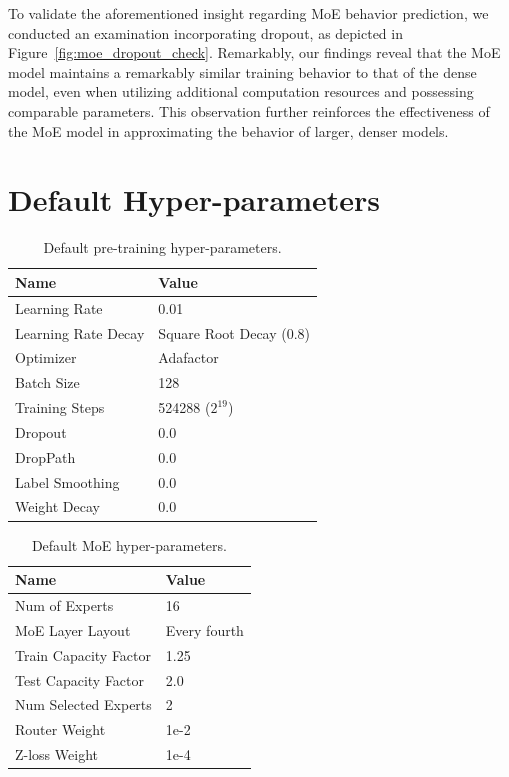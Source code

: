 \documentclass{article}
\begin{document}
To validate the aforementioned insight regarding MoE behavior prediction, we conducted an examination incorporating dropout, as depicted in Figure~\ref{fig:moe_dropout_check}. Remarkably, our findings reveal that the MoE model maintains a remarkably similar training behavior to that of the dense model, even when utilizing additional computation resources and possessing comparable parameters. This observation further reinforces the effectiveness of the MoE model in approximating the behavior of larger, denser models.

\newpage

\section{Default Hyper-parameters}\label{sec:default-hyper-parameters}

\begin{table}[h]
\caption{Default pre-training hyper-parameters.}
\vspace{5pt}
\centering
\begin{tabular}{l l}
\toprule 
Name  &  Value    \\ \midrule
Learning Rate    & 0.01 \\
Learning Rate Decay & Square Root Decay (0.8) \\
Optimizer & Adafactor \\
Batch Size & 128 \\
Training Steps & 524288 ($2^{19}$) \\
Dropout & 0.0 \\
DropPath & 0.0 \\
Label Smoothing & 0.0 \\
Weight Decay & 0.0 \\
\bottomrule
\end{tabular}
\label{tbl:hyper-parameters}
\end{table}

\begin{table}[h]
\caption{Default MoE hyper-parameters.}
\vspace{5pt}
\centering
\begin{tabular}{l l}
\toprule 
Name  &  Value    \\ \midrule
Num of Experts    & 16 \\
MoE Layer Layout & Every fourth \\
Train Capacity Factor & 1.25 \\
Test Capacity Factor & 2.0 \\
Num Selected Experts & 2 \\
Router Weight  & 1e-2 \\
Z-loss Weight  & 1e-4 \\
\bottomrule
\end{tabular}
\label{tbl:moe-hyper-parameters}
\end{table}
\end{document}
